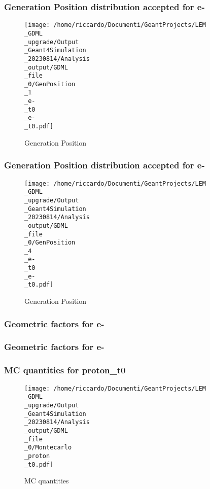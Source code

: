 \documentclass[8pt]{beamer}
\begin{document}
            \begin{frame}
                \frametitle{Generation Position distribution accepted for e-}
            
        \begin{figure}[h]
            \centering
            \texttt{[image: /home/riccardo/Documenti/GeantProjects/LEM\\\_GDML\\\_upgrade/Output\\\_Geant4Simulation\\\_20230814/Analysis\\\_output/GDML\\\_file\\\_0/GenPosition\\\_1\\\_e-\\\_t0\\\_e-\\\_t0.pdf]}
            \caption{Generation Position}
        \end{figure}
        
            \end{frame}
            
            \begin{frame}
                \frametitle{Generation Position distribution accepted for e-}
            
        \begin{figure}[h]
            \centering
            \texttt{[image: /home/riccardo/Documenti/GeantProjects/LEM\\\_GDML\\\_upgrade/Output\\\_Geant4Simulation\\\_20230814/Analysis\\\_output/GDML\\\_file\\\_0/GenPosition\\\_4\\\_e-\\\_t0\\\_e-\\\_t0.pdf]}
            \caption{Generation Position}
        \end{figure}
        
            \end{frame}
            
            \begin{frame}
                \frametitle{Geometric factors for e-}
            
            \end{frame}
            
            \begin{frame}
                \frametitle{Geometric factors for e-}
            
            \end{frame}
            
            \begin{frame}
                \frametitle{MC quantities for proton\_t0}
            
        \begin{figure}[h]
            \centering
            \texttt{[image: /home/riccardo/Documenti/GeantProjects/LEM\\\_GDML\\\_upgrade/Output\\\_Geant4Simulation\\\_20230814/Analysis\\\_output/GDML\\\_file\\\_0/Montecarlo\\\_proton\\\_t0.pdf]}
            \caption{MC quantities}
        \end{figure}
        
            \end{frame}
            
\end{document}
